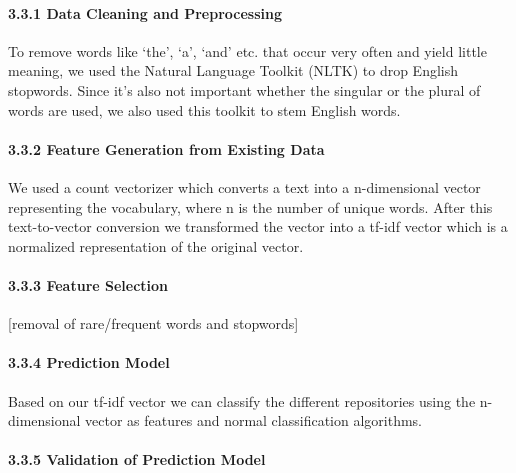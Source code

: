 \documentclass{article}
\begin{document}
\paragraph{3.3.1 Data Cleaning and
Preprocessing}\label{data-cleaning-and-preprocessing-1}

To remove words like `the', `a', `and' etc. that occur very often and
yield little meaning, we used the Natural Language Toolkit (NLTK) to
drop English stopwords. Since it's also not important whether the
singular or the plural of words are used, we also used this toolkit to
stem English words.

\paragraph{3.3.2 Feature Generation from Existing
Data}\label{feature-generation-from-existing-data}

We used a count vectorizer which converts a text into a n-dimensional
vector representing the vocabulary, where n is the number of unique
words. After this text-to-vector conversion we transformed the vector
into a tf-idf vector which is a normalized representation of the
original vector.

\paragraph{3.3.3 Feature Selection}\label{feature-selection-1}

{[}removal of rare/frequent words and stopwords{]}

\paragraph{3.3.4 Prediction Model}\label{prediction-model-1}

Based on our tf-idf vector we can classify the different repositories
using the n-dimensional vector as features and normal classification
algorithms.

\paragraph{3.3.5 Validation of Prediction
Model}\label{validation-of-prediction-model-1}
\end{document}
